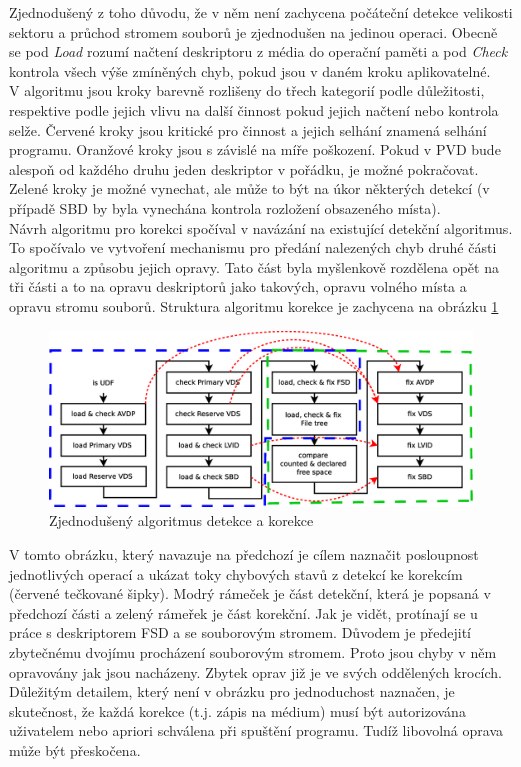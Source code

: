 Zjednodušený z toho důvodu, že v něm není zachycena počáteční detekce velikosti sektoru a průchod stromem souborů je zjednodušen na jedinou operaci. Obecně se pod \textit{Load} rozumí načtení deskriptoru z média do operační paměti a pod \textit{Check} kontrola všech výše zmíněných chyb, pokud jsou v daném kroku aplikovatelné.\\
V algoritmu jsou kroky barevně rozlišeny do třech kategorií podle důležitosti, respektive podle jejich vlivu na další činnost pokud jejich načtení nebo kontrola selže. Červené kroky jsou kritické pro činnost a jejich selhání znamená selhání programu. Oranžové kroky jsou s závislé na míře poškození. Pokud v PVD bude alespoň od každého druhu jeden deskriptor v pořádku, je možné pokračovat. Zelené kroky je možné vynechat, ale může to být na úkor některých detekcí (v případě SBD by byla vynechána kontrola rozložení obsazeného místa).\\
Návrh algoritmu pro korekci spočíval v navázání na existující detekční algoritmus. To spočívalo ve vytvoření mechanismu pro předání nalezených chyb druhé části algoritmu a způsobu jejich opravy. Tato část byla myšlenkově rozdělena opět na tři části a to na opravu deskriptorů jako takových, opravu volného místa a opravu stromu souborů. Struktura algoritmu korekce je zachycena na obrázku \ref{fig:steps-korekce}
\begin{figure}[h] 
    \centering
    \includegraphics[scale=0.4]{obrazky/steps-korekce.eps}
    \caption{Zjednodušený algoritmus detekce a korekce}
    \label{fig:steps-korekce}
\end{figure}
V tomto obrázku, který navazuje na předchozí je cílem naznačit posloupnost jednotlivých operací a ukázat toky chybových stavů z detekcí ke korekcím (červené tečkované šipky). Modrý rámeček je část detekční, která je popsaná v předchozí části a zelený rámeřek je část korekční. Jak je vidět, protínají se u práce s deskriptorem FSD a se souborovým stromem. Důvodem je předejití zbytečnému dvojímu procházení souborovým stromem. Proto jsou chyby v něm opravovány jak jsou nacházeny. Zbytek oprav již je ve svých oddělených krocích.\\
Důležitým detailem, který není v obrázku pro jednoduchost naznačen, je skutečnost, že každá korekce (t.j. zápis na médium) musí být autorizována uživatelem nebo apriori schválena při spuštění programu. Tudíž libovolná oprava může být přeskočena.

